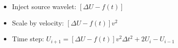 \begin{itemize}
\item Inject source wavelet: $\left[ \Delta U - f(t) \right]$
\tiny

\normalsize

\item Scale by velocity: $\left[ \Delta U - f(t) \right] v^2$
\tiny

\normalsize

\item Time step: 
$U_{i+1} = \left[ \Delta U -f(t) \right] v^2 \Delta t^2 + 2 U_{i} - U_{i-1}$
\tiny

\normalsize

\end{itemize}

%
%
%

